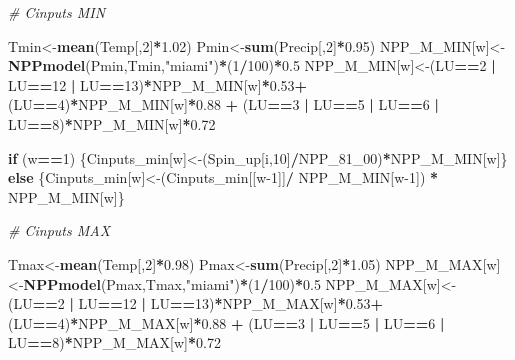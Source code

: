\documentclass[
  10pt,
  b5paper,
]{book}
\newenvironment{Shaded}{\begin{snugshade}}{\end{snugshade}}
\newcommand{\CommentTok}[1]{\textcolor[rgb]{0.56,0.35,0.01}{\textit{#1}}}
\newcommand{\ControlFlowTok}[1]{\textcolor[rgb]{0.13,0.29,0.53}{\textbf{#1}}}
\newcommand{\DecValTok}[1]{\textcolor[rgb]{0.00,0.00,0.81}{#1}}
\newcommand{\FloatTok}[1]{\textcolor[rgb]{0.00,0.00,0.81}{#1}}
\newcommand{\KeywordTok}[1]{\textcolor[rgb]{0.13,0.29,0.53}{\textbf{#1}}}
\newcommand{\NormalTok}[1]{#1}
\newcommand{\OperatorTok}[1]{\textcolor[rgb]{0.81,0.36,0.00}{\textbf{#1}}}
\newcommand{\StringTok}[1]{\textcolor[rgb]{0.31,0.60,0.02}{#1}}
\begin{document}
\begin{Shaded}
\begin{Highlighting}[]
{\CommentTok{# Cinputs MIN}

\NormalTok{Tmin<-}\KeywordTok{mean}\NormalTok{(Temp[,}\DecValTok{2}\NormalTok{]}\OperatorTok{*}\FloatTok{1.02}\NormalTok{)}
\NormalTok{Pmin<-}\KeywordTok{sum}\NormalTok{(Precip[,}\DecValTok{2}\NormalTok{]}\OperatorTok{*}\FloatTok{0.95}\NormalTok{)}
\NormalTok{NPP_M_MIN[w]<-}\KeywordTok{NPPmodel}\NormalTok{(Pmin,Tmin,}\StringTok{"miami"}\NormalTok{)}\OperatorTok{*}\NormalTok{(}\DecValTok{1}\OperatorTok{/}\DecValTok{100}\NormalTok{)}\OperatorTok{*}\FloatTok{0.5}
\NormalTok{NPP_M_MIN[w]<-(LU}\OperatorTok{==}\DecValTok{2} \OperatorTok{|}\StringTok{ }\NormalTok{LU}\OperatorTok{==}\DecValTok{12} \OperatorTok{|}\StringTok{ }\NormalTok{LU}\OperatorTok{==}\DecValTok{13}\NormalTok{)}\OperatorTok{*}\NormalTok{NPP_M_MIN[w]}\OperatorTok{*}\FloatTok{0.53}\OperatorTok{+}\StringTok{ }\NormalTok{(LU}\OperatorTok{==}\DecValTok{4}\NormalTok{)}\OperatorTok{*}\NormalTok{NPP_M_MIN[w]}\OperatorTok{*}\FloatTok{0.88} \OperatorTok{+}\StringTok{ }\NormalTok{(LU}\OperatorTok{==}\DecValTok{3} \OperatorTok{|}\StringTok{ }\NormalTok{LU}\OperatorTok{==}\DecValTok{5} \OperatorTok{|}\StringTok{ }\NormalTok{LU}\OperatorTok{==}\DecValTok{6} \OperatorTok{|}\StringTok{ }\NormalTok{LU}\OperatorTok{==}\DecValTok{8}\NormalTok{)}\OperatorTok{*}\NormalTok{NPP_M_MIN[w]}\OperatorTok{*}\FloatTok{0.72}

\ControlFlowTok{if}\NormalTok{ (w}\OperatorTok{==}\DecValTok{1}\NormalTok{) \{Cinputs_min[w]<-(Spin_up[i,}\DecValTok{10}\NormalTok{]}\OperatorTok{/}\NormalTok{NPP_}\DecValTok{81}\NormalTok{_}\DecValTok{00}\NormalTok{)}\OperatorTok{*}\NormalTok{NPP_M_MIN[w]\} }\ControlFlowTok{else}\NormalTok{ \{Cinputs_min[w]<-(Cinputs_min[[w}\DecValTok{-1}\NormalTok{]]}\OperatorTok{/}\StringTok{ }\NormalTok{NPP_M_MIN[w}\DecValTok{-1}\NormalTok{]) }\OperatorTok{*}\StringTok{ }\NormalTok{NPP_M_MIN[w]\} }

\CommentTok{# Cinputs MAX}

\NormalTok{Tmax<-}\KeywordTok{mean}\NormalTok{(Temp[,}\DecValTok{2}\NormalTok{]}\OperatorTok{*}\FloatTok{0.98}\NormalTok{)}
\NormalTok{Pmax<-}\KeywordTok{sum}\NormalTok{(Precip[,}\DecValTok{2}\NormalTok{]}\OperatorTok{*}\FloatTok{1.05}\NormalTok{)}
\NormalTok{NPP_M_MAX[w]<-}\KeywordTok{NPPmodel}\NormalTok{(Pmax,Tmax,}\StringTok{"miami"}\NormalTok{)}\OperatorTok{*}\NormalTok{(}\DecValTok{1}\OperatorTok{/}\DecValTok{100}\NormalTok{)}\OperatorTok{*}\FloatTok{0.5}
\NormalTok{NPP_M_MAX[w]<-(LU}\OperatorTok{==}\DecValTok{2} \OperatorTok{|}\StringTok{ }\NormalTok{LU}\OperatorTok{==}\DecValTok{12} \OperatorTok{|}\StringTok{ }\NormalTok{LU}\OperatorTok{==}\DecValTok{13}\NormalTok{)}\OperatorTok{*}\NormalTok{NPP_M_MAX[w]}\OperatorTok{*}\FloatTok{0.53}\OperatorTok{+}\StringTok{ }\NormalTok{(LU}\OperatorTok{==}\DecValTok{4}\NormalTok{)}\OperatorTok{*}\NormalTok{NPP_M_MAX[w]}\OperatorTok{*}\FloatTok{0.88} \OperatorTok{+}\StringTok{ }\NormalTok{(LU}\OperatorTok{==}\DecValTok{3} \OperatorTok{|}\StringTok{ }\NormalTok{LU}\OperatorTok{==}\DecValTok{5} \OperatorTok{|}\StringTok{ }\NormalTok{LU}\OperatorTok{==}\DecValTok{6} \OperatorTok{|}\StringTok{ }\NormalTok{LU}\OperatorTok{==}\DecValTok{8}\NormalTok{)}\OperatorTok{*}\NormalTok{NPP_M_MAX[w]}\OperatorTok{*}\FloatTok{0.72}

}
\end{Highlighting}
\end{Shaded}
\end{document}

